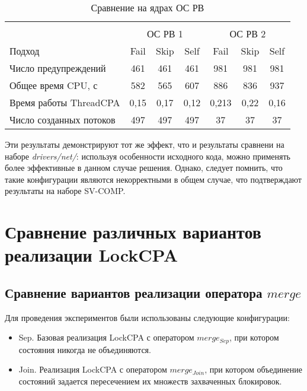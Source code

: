   \begin{table}[h]\footnotesize \centering
    \caption{Сравнение на ядрах ОС РВ}
  	\label{table-os-thread-create}
    \begin{tabular}{ | l | c | c | c | c | c | c |}
      \hline
      				& 		\multicolumn{3}{c|}{\combatmode} 		& \multicolumn{3}{c|}{\combatmode} \\
      						& 		\multicolumn{3}{c|}{ОС РВ 1} 		& \multicolumn{3}{c|}{ОС РВ 2} \\
      Подход         				& Fail 		& Skip 		& Self 		& Fail 		& Skip 		& Self  \\ \hline
      Число предупреждений			& 461   	& 461  		& 461  		& 981   	& 981   	& 981   \\ 
  	  Общее время CPU, с 			& 582 		& 565 		& 607  		& 886   	& 836	  	& 937   \\ 
\hspace{0.5cm} Время работы ThreadCPA & 0,15	& 0,17 		& 0,12 		& 0,213   	& 0,22 		& 0,16   \\ \hline
      Число созданных потоков  		& 497    	& 497    	& 497   	& 37   		& 37  		& 37   \\ 
      \hline
    \end{tabular}
  \end{table}

Эти результаты демонстрируют тот же эффект, что и результаты  сравнени на наборе \textit{drivers/net/}: используя особенности исходного кода, можно применять более эффективные в данном случае решения.
Однако, следует помнить, что такие конфигурации являются некорректными в общем случае, что подтверждают результаты на наборе SV-COMP.

\section{Сравнение различных вариантов реализации LockCPA}

\subsection{Сравнение вариантов реализации оператора $merge$}

Для проведения экспериментов были использованы следующие конфигурации:

\begin{itemize}
\item Sep. Базовая реализация LockCPA с оператором $merge_{Sep}$, при котором состояния никогда не объединяются.
\item Join. Реализация LockCPA с оператором $merge_{Join}$, при котором объединение состояний задается пересечением их множеств захваченных блокировок.
\end{itemize}


